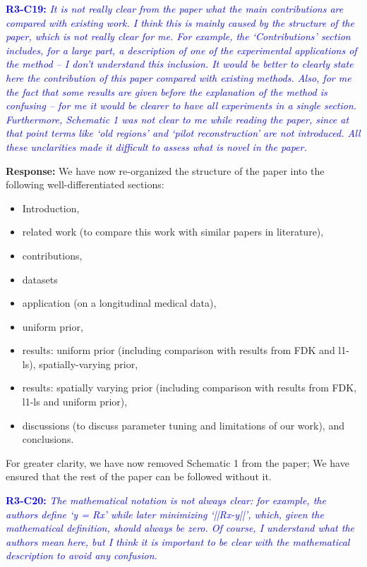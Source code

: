 \documentclass{article}
\begin{document}
\textcolor{blue}{\textbf{R3-C19:}\textit{ It is not really clear from the paper what the main contributions are compared with existing work. I think this is mainly caused by the structure of the paper, which is not really clear for me. For example, the `Contributions' section includes, for a large part, a description of one of the experimental applications of the method -- I don't understand this inclusion. It would be better to clearly state here the contribution of this paper compared with existing methods. Also, for me the fact that some results are given before the explanation of the method is confusing -- for me it would be clearer to have all experiments in a single section. Furthermore, Schematic 1 was not clear to me while reading the paper, since at that point terms like `old regions' and `pilot reconstruction' are not introduced. All these unclarities made it difficult to assess what is novel in the paper.}}

\textbf{Response:} We have now re-organized the structure of the paper into the following well-differentiated sections:
\begin{itemize}
  
\item Introduction, 
\item related work (to compare this work with similar papers in literature), 
\item contributions,
\item datasets
\item application (on a longitudinal medical data), 
\item uniform prior, 
\item results: uniform prior (including comparison with results from FDK and l1-ls), 
spatially-varying prior, 
\item results: spatially varying prior (including comparison with results from FDK, l1-ls and uniform prior), 
\item discussions (to discuss parameter tuning and limitations of our work), and 
  conclusions.
  \end{itemize}
For greater clarity, we have now removed Schematic 1 from the paper; We have  ensured that the rest of the paper can be followed without it.

\textcolor{blue}{\textbf{R3-C20:}\textit{ The mathematical notation is not always clear: for example, the authors define `y = Rx' while later minimizing `||Rx-y||', which, given the mathematical definition, should always be zero. Of course, I understand what the authors mean here, but I think it is important to be clear with the mathematical description to avoid any confusion.}}
\end{document}
